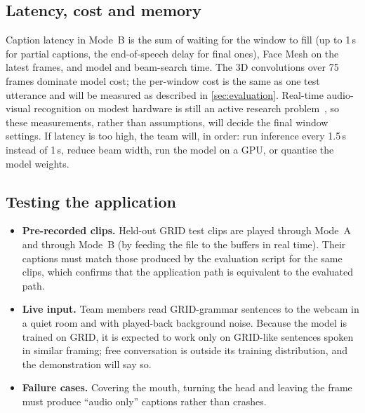\subsection{Latency, cost and memory}
Caption latency in Mode~B is the sum of waiting for the window to fill (up to
1\,s for partial captions, the end-of-speech delay for final ones), Face Mesh on
the latest frames, and model and beam-search time. The 3D convolutions over 75
frames dominate model cost; the per-window cost is the same as one test
utterance and will be measured as described in \cref{sec:evaluation}. Real-time
audio-visual recognition on modest hardware is still an active research
problem~\cite{ryumin2023,aripin2024}, so these measurements, rather than
assumptions, will decide the final window settings. If latency
is too high, the team will, in order: run inference every 1.5\,s instead of 1\,s,
reduce beam width, run the model on a GPU, or quantise the model weights.

\subsection{Testing the application}
\begin{itemize}
  \item \textbf{Pre-recorded clips.} Held-out GRID test clips are played through
        Mode~A and through Mode~B (by feeding the file to the buffers in real time).
        Their captions must match those produced by the evaluation script for the
        same clips, which confirms that the application path is equivalent to the
        evaluated path.
  \item \textbf{Live input.} Team members read GRID-grammar sentences to the
        webcam in a quiet room and with played-back background noise. Because the
        model is trained on GRID, it is expected to work only on GRID-like sentences
        spoken in similar framing; free conversation is outside its training
        distribution, and the demonstration will say so.
  \item \textbf{Failure cases.} Covering the mouth, turning the head and leaving the
        frame must produce ``audio only'' captions rather than crashes.
\end{itemize}
